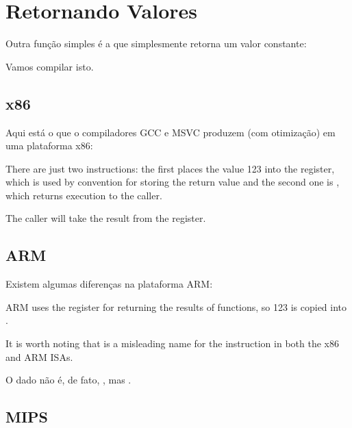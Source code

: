 \section{Retornando Valores}
\label{ret_val_func}

Outra função simples é a que simplesmente retorna um valor constante:



Vamos compilar isto.

\subsection{x86}

Aqui está o que o compiladores GCC e MSVC produzem (com otimização) em uma plataforma x86:



There are just two instructions: the first places the value 123 into the \EAX register, 
which is used by convention for storing the return
value and the second one is \RET, which returns execution to the \gls{caller}.

The caller will take the result from the \EAX register.

\subsection{ARM}

Existem algumas diferenças na plataforma ARM:



ARM uses the register  for returning the results of functions, so 123 is copied into .

It is worth noting that \MOV is a misleading name for the instruction in both the x86 and ARM \ac{ISA}s.

O dado não é, de fato, , mas .

\subsection{MIPS}

\label{MIPS_leaf_function_ex1}

